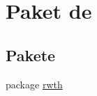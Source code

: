 \hypertarget{namespacede}{\section{Paket de}
\label{namespacede}
}
\subsection*{Pakete}
\begin{DoxyCompactItemize}
\item 
package \hyperlink{namespacede_1_1rwth}{rwth}
\end{DoxyCompactItemize}
